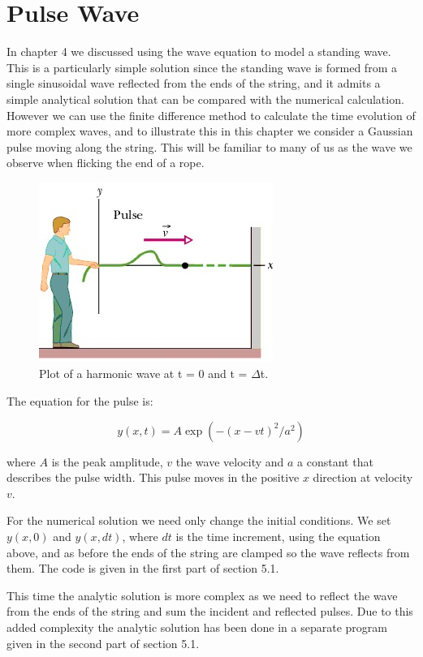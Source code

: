 \documentclass[oneside,hidelinks]{book}
\begin{document}
                        \chapter{Pulse Wave}
                        In chapter 4 we discussed using the wave equation to model a standing wave. This is a particularly simple solution since the standing wave is formed from a single sinusoidal wave reflected from the ends of the string, and it admits a simple analytical solution that can be compared with the numerical calculation. However we can use the finite difference method to calculate the time evolution of more complex waves, and to illustrate this in this chapter we consider a Gaussian pulse moving along the string. This will be familiar to many of us as the wave we observe when flicking the end of a rope.

                        \begin{figure}[hbtp]
                                \caption{ Plot of a harmonic wave at t = 0 and t = $\Delta$t.}
                                \hspace*{2cm}\includegraphics[scale=0.9]{travelling_wave(1).png}        
                        \end{figure}

The equation for the pulse is:

$$ y(x,t) = A \exp(-(x - vt)^2/a^2) $$

where $A$ is the peak amplitude, $v$ the wave velocity and $a$ a constant that describes the pulse width. This pulse moves in the positive $x$ direction at velocity $v$.

For the numerical solution we need only change the initial conditions. We set $y(x,0)$ and $y(x,dt)$, where $dt$ is the time increment, using the equation above, and as before the ends of the string are clamped so the wave reflects from them. The code is given in the first part of section 5.1.

This time the analytic solution is more complex as we need to reflect the wave from the ends of the string and sum the incident and reflected pulses. Due to this added complexity the analytic solution has been done in a separate program given in the second part of section 5.1.
\end{document}

